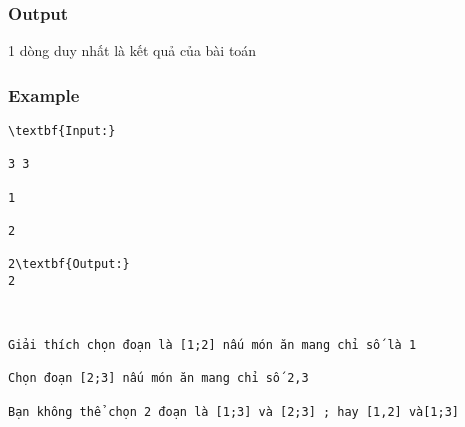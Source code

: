 \subsubsection{   Output  }

   1 dòng duy nhất là kết quả của bài toán  

\subsubsection{   Example  }
\begin{verbatim}
\textbf{Input:}

3 3

1

2

2\textbf{Output:}
2\end{verbatim}
\begin{verbatim}


Giải thích chọn đoạn là [1;2] nấu món ăn mang chỉ số là 1

Chọn đoạn [2;3] nấu món ăn mang chỉ số 2,3

Bạn không thể chọn 2 đoạn là [1;3] và [2;3] ; hay [1,2] và[1;3]\end{verbatim}
